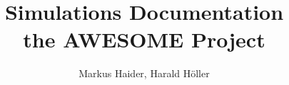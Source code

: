 \documentclass[a4paper,11pt,fleqn,oneside]{book}
\author{Markus Haider, Harald H\"oller}
\begin{document}
\title{\textbf{Simulations Documentation} \\
the AWESOME Project}
\maketitle
\tableofcontents





\end{document}
